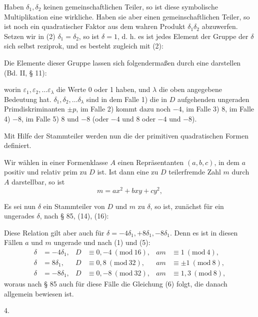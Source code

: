 
Haben $\delta_1, \delta_2$ keinen gemeinschaftlichen Teiler, so ist diese
symbolische Multiplikation eine wirkliche. Haben sie aber einen
gemeinschaftlichen Teiler, so ist noch ein quadratischer Faktor
aus dem wahren Produkt $\delta_1\delta_2$ abzuwerfen. Setzen wir in (2)
$\delta_1 = \delta_2$, so ist $\delta = 1$, d. h. es ist jedes Element der Gruppe
der $\delta$ sich selbst reziprok, und es besteht zugleich mit (2):


Die Elemente dieser Gruppe lassen sich folgendermaßen durch eine
 darstellen (Bd. II, § 11):


worin $\varepsilon_1, \varepsilon_2, \dots \varepsilon_\lambda$ die Werte 0 oder 1 haben, und $\lambda$ die oben
angegebene Bedeutung hat. $\delta_1, \delta_2, \dots \delta_\lambda$ sind in dem Falle 1) die
in $D$ aufgehenden ungeraden Primdiskriminanten $\pm p$, im Falle 2)
kommt dazu noch $-4$, im Falle 3) $8$, im Falle 4) $-8$, im
Falle 5) $8$ und $-8$ (oder $-4$ und $8$ oder $-4$ und $-8$).

Mit Hilfe der Stammteiler werden nun die  der
primitiven quadratischen Formen definiert.

Wir wählen in einer Formenklasse $A$ einen Repräsentanten
$(a,b,c)$, in dem $a$ positiv und relativ prim zu $D$ ist. Ist dann eine
zu $D$ teilerfremde Zahl $m$ durch $A$ darstellbar, so ist
\[
m = ax^2 + bxy + cy^2,
\]

Es sei nun $\delta$ ein Stammteiler von $D$ und $m$ 
zu $\delta$, so ist, zunächst für ein ungerades $\delta$, nach § 85, (14), (16):


Diese Relation gilt aber auch für $\delta = -4\delta_1, +8\delta_1, -8\delta_1$.
Denn es ist in diesen Fällen $a$ und $m$ ungerade und nach (1)
und (5):
\[
\begin{aligned}
\delta &= -4\delta_1, & D &\equiv 0, -4 \ (\mathrm{mod}\ 16), & am &\equiv 1 \ (\mathrm{mod}\ 4), \\
\delta &= 8\delta_1, & D &\equiv 0, 8 \ (\mathrm{mod}\ 32), & am &\equiv \pm 1 \ (\mathrm{mod}\ 8), \\
\delta &= -8\delta_1, & D &\equiv 0, -8 \ (\mathrm{mod}\ 32), & am &\equiv 1, 3 \ (\mathrm{mod}\ 8),
\end{aligned}
\]
woraus nach § 85 auch für diese Fälle die Gleichung (6) folgt,
die danach allgemein bewiesen ist.

4. 
